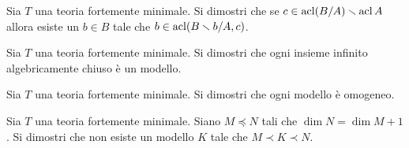 \begin{exercise}\label{scambioex}
Sia $T$ una teoria fortemente minimale. Si dimostri che se $c\in\mathop{\rm acl}(B/A)\smallsetminus\mathop{\rm acl} A$ allora esiste un $b\in B$ tale che $b\in\mathop{\rm acl}(B\smallsetminus b/A,c)$.\QED 
\end{exercise}

\begin{exercise}
Sia $T$ una teoria fortemente minimale. Si dimostri che ogni insieme infinito algebricamente chiuso \`e un modello.\QED 
\end{exercise}

\begin{exercise}
Sia $T$ una teoria fortemente minimale. Si dimostri che ogni modello \`e omogeneo.\QED 
\end{exercise}

\begin{exercise}
Sia $T$ una teoria fortemente minimale. Siano $M\preceq N$ tali che $\dim N=\dim M+1$. Si dimostri che non esiste un modello $K$ tale che $M\prec K\prec N$.\QED 
\end{exercise}



% 

